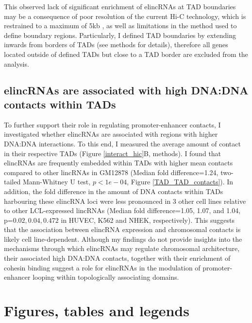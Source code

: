 \documentclass[11pt,a4paper]{report}
\begin{document}
This observed lack of significant enrichment  of elincRNAs at TAD boundaries may be a consequence of poor resolution of the current Hi-C technology, which is restrained to a maximum of 5kb \cite{Rao2014}⁠, as well as limitations in the method used to define boundary regions. Particularly, I defined TAD boundaries by extending inwards from borders of TADs (see methods for details), therefore all genes located outside of defined TADs but close to a TAD border are excluded from the analysis. 


\subsection*{elincRNAs are associated with high DNA:DNA contacts within TADs}

To further support their role in regulating promoter-enhancer contacts, I investigated whether elincRNAs are associated with regions with higher DNA:DNA interactions. To this end, I measured the average amount of contact in their respective TADs (Figure \ref{interact_hic}B, methods). I found that elincRNAs are frequently embedded within TADs with higher mean contacts compared to other lincRNAs in GM12878 (Median fold difference=1.24, two-tailed Mann-Whitney U test, $p<1e-04$, Figure \ref{TAD_TAD_contacts}). In addition, the fold difference in the amount of DNA contacts within TADs harbouring these elincRNA loci were less pronounced in 3 other cell lines relative to other LCL-expressed lincRNAs (Median fold difference=1.05, 1.07, and 1.04, p=$0.02, 0.04, 0.472$ in HUVEC, K562 and NHEK, respectively). This suggests that the association between elincRNA expression and chromosomal contacts is likely cell line-dependent. 
Although my findings do not provide insights into the mechanisms through which elincRNAs may regulate chromosomal architecture, their associated high DNA:DNA contacts, together with their enrichment of cohesin binding suggest a role for elincRNAs in the modulation of promoter-enhancer looping within topologically associating domains.

\section*{Figures, tables and legends}
\end{document}
